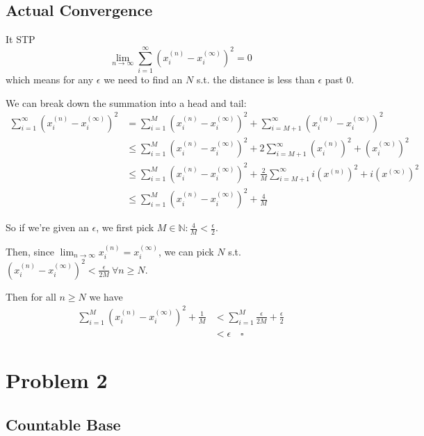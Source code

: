 \documentclass[12pt]{article}
\newcommand{\N}{\mathbb{N}}
\begin{document}
\pagebreak

\subsection{Actual Convergence}

It STP
\[\lim_{n \to \infty} \sum_{i=1}^{\infty} \left(x^{(n)}_i-x^{(\infty)}_i\right)^2 = 0\]
which means for any $\epsilon$ we need to find an $N$ s.t. the distance is less than $\epsilon$ past $0$.

We can break down the summation into a head and tail:
\begin{align*}
  \sum_{i=1}^{\infty} \left(x^{(n)}_i-x^{(\infty)}_i\right)^2
   & = \sum_{i=1}^{M} \left(x^{(n)}_i-x^{(\infty)}_i\right)^2
  + \sum_{i=M+1}^{\infty} \left(x^{(n)}_i-x^{(\infty)}_i\right)^2                          \\
   & \le \sum_{i=1}^{M} \left(x^{(n)}_i-x^{(\infty)}_i\right)^2
  + 2\sum_{i=M+1}^{\infty} \left(x^{(n)}_i\right)^2+\left(x^{(\infty)}_i\right)^2               \\
   & \le \sum_{i=1}^{M} \left(x^{(n)}_i-x^{(\infty)}_i\right)^2
  + \frac{2}{M} \sum_{i=M+1}^{\infty} i\left(x^{(n)}\right)^2+i\left(x^{(\infty)}\right)^2 \\
   & \le \sum_{i=1}^{M} \left(x^{(n)}_i-x^{(\infty)}_i\right)^2 + \frac{4}{M}
\end{align*}

So if we're given an $\epsilon$, we first pick $M \in \N: \frac{4}{M} < \frac{\epsilon}{2}$.

Then, since $\lim_{n \to \infty} x^{(n)}_i = x^{(\infty)}_i$,
we can pick $N$ s.t. $\left(x^{(n)}_i-x^{(\infty)}_i\right)^2 < \frac{\epsilon}{2M}\ \forall n \ge N$.

Then for all $n \ge N$ we have
\begin{align*}
  \sum_{i=1}^{M} \left(x^{(n)}_i-x^{(\infty)}_i\right)^2 + \frac{1}{M}
   & < \sum_{i=1}^{M} \frac{\epsilon}{2M} + \frac{\epsilon}{2} \\
   & < \epsilon\quad\square
\end{align*}

\pagebreak

\section{Problem 2}

\subsection{Countable Base}
\end{document}
